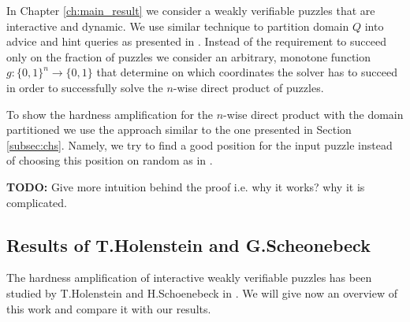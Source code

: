 In Chapter \ref{ch:main_result} we consider a weakly verifiable puzzles that are interactive and dynamic.
We use similar technique to partition domain $Q$ into advice and hint queries as presented in \cite{Dodis:2009:SAI:1530441.1530450}.
Instead of the requirement to succeed only on the fraction of puzzles we consider an arbitrary, monotone function $g : \{0,1\}^{n} \rightarrow \{0,1\}$
that determine on which coordinates the solver has to succeed in order to successfully solve the $n$-wise direct product of puzzles.

To show the hardness amplification for the $n$-wise direct product with the domain partitioned we use
the approach similar to the one presented in Section \ref{subsec:chs}. Namely, we try to find a good position for the input puzzle instead of
choosing this position on random as in \cite{Dodis:2009:SAI:1530441.1530450}.

\begin{todo}
  \textbf{TODO:} Give more intuition behind the proof i.e. why it works? why it is complicated.
\end{todo}

\subsection{Results of T.Holenstein and G.Scheonebeck}
The hardness amplification of interactive weakly verifiable puzzles has been studied by T.Holenstein and H.Schoenebeck in \cite{DBLP:journals/corr/abs-1002-3534}.
We will give now an overview of this work and compare it with our results.

